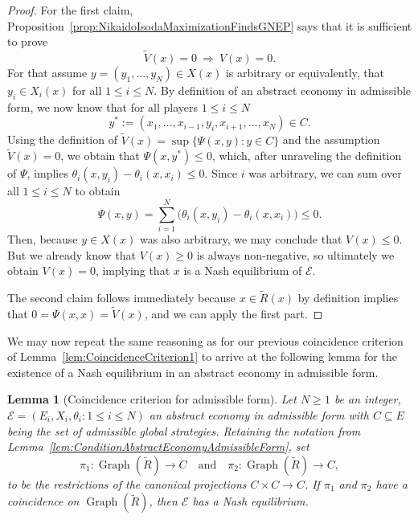 \documentclass[a4paper,11pt,reqno,english]{amsart}
\newtheorem{lemma}[theorem]{Lemma}
\theoremstyle{definition}
\begin{document}
\begin{proof}
	For the first claim, Proposition~\ref{prop:NikaidoIsodaMaximizationFindsGNEP} says that it is sufficient to prove
	\begin{displaymath}
		\widetilde{V}(x)=0 \ \Longrightarrow \ V(x)=0.
	\end{displaymath}
	For that assume $y=(y_1,\dots,y_N)\in X(x)$ is arbitrary or equivalently, that $y_i\in X_i(x)$ for all $1\leq i \leq N$. By definition of an abstract economy in admissible form, we now know that for all players $1\leq i\leq N$
	\begin{displaymath}
		y^*:=(x_1,\dots,x_{i-1},y_i,x_{i+1},\dots,x_N)\in C.
	\end{displaymath}
	Using the definition of $\tilde{V}(x) = \sup\{\Psi(x, y) \colon y\in C\}$ and the assumption $\tilde{V}(x) = 0$, we obtain that $\Psi(x,y^*) \leq 0$, which, after unraveling the definition of $\Psi$, implies $\theta_i(x,y_i)-\theta_i(x,x_i) \leq 0$.
	Since $i$ was arbitrary, we can sum over all $1\leq i \leq N$ to obtain
	\begin{displaymath}
		\Psi(x,y)=\sum_{i=1}^{N}\big(\theta_i(x,y_i)-\theta_i(x,x_i)\big)\leq 0.
	\end{displaymath}
	Then, because $y\in X(x)$ was also arbitrary, we may conclude that $V(x)\leq 0$. But we already know that $V(x)\geq 0$ is always non-negative, so ultimately we obtain $V(x)=0$, implying that $x$ is a Nash equilibrium of $\mathcal{E}$.

	The second claim follows immediately because $x\in\tilde{R}(x)$ by definition implies that $0=\Psi(x,x)=\tilde{V}(x)$, and we can apply the first part.
\end{proof}

We may now repeat the same reasoning as for our previous coincidence criterion of Lemma~\ref{lem:CoincidenceCriterion1} to arrive at the following lemma for the existence of a Nash equilibrium in an abstract economy in admissible form.

\begin{lemma}[Coincidence criterion for admissible form]\label{lem:CoincidenceCriterionAdmissibleForm}
	Let $N\geq 1$ be an integer, $\mathcal{E}=(E_i,X_i,\theta_i : 1\leq i\leq N)$ an abstract economy in admissible form with $C\subseteq E$ being the set of admissible global strategies. Retaining the notation from Lemma~\ref{lem:ConditionAbstractEconomyAdmissibleForm}, set
	\begin{displaymath}
		\pi_1 \colon \operatorname{Graph}(\widetilde{R})\longrightarrow C \quad \text{and}\quad \pi_2 \colon \operatorname{Graph}(\widetilde{R})\longrightarrow C,
	\end{displaymath}
	to be the restrictions of the canonical projections $C\times C\longrightarrow C$. If $\pi_1$ and $\pi_2$ have a coincidence on $\operatorname{Graph}(\tilde{R})$, then $\mathcal{E}$ has a Nash equilibrium.
\end{lemma}
\end{document}
